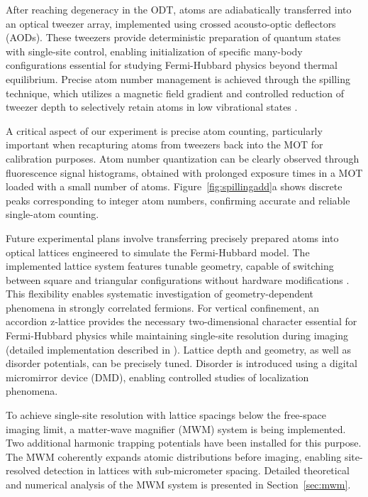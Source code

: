 After reaching degeneracy in the ODT, atoms are adiabatically transferred into an optical tweezer array, implemented using crossed acousto-optic deflectors (AODs). These tweezers provide deterministic preparation of quantum states with single-site control, enabling initialization of specific many-body configurations essential for studying Fermi-Hubbard physics beyond thermal equilibrium. Precise atom number management is achieved through the spilling technique, which utilizes a magnetic field gradient and controlled reduction of tweezer depth to selectively retain atoms in low vibrational states \cite{culemann_construction_2024, huang_construction_2024}.

A critical aspect of our experiment is precise atom counting, particularly important when recapturing atoms from tweezers back into the MOT for calibration purposes. Atom number quantization can be clearly observed through fluorescence signal histograms, obtained with prolonged exposure times in a MOT loaded with a small number of atoms. Figure~\ref{fig:spillingadd}a shows discrete peaks corresponding to integer atom numbers, confirming accurate and reliable single-atom counting.

Future experimental plans involve transferring precisely prepared atoms into optical lattices engineered to simulate the Fermi-Hubbard model. The implemented lattice system features tunable geometry, capable of switching between square and triangular configurations without hardware modifications \cite{dux_optical_2023}. This flexibility enables systematic investigation of geometry-dependent phenomena in strongly correlated fermions. For vertical confinement, an accordion z-lattice provides the necessary two-dimensional character essential for Fermi-Hubbard physics while maintaining single-site resolution during imaging (detailed implementation described in \cite{huang_construction_2024}). Lattice depth and geometry, as well as disorder potentials, can be precisely tuned. Disorder is introduced using a digital micromirror device (DMD), enabling controlled studies of localization phenomena. 

To achieve single-site resolution with lattice spacings below the free-space imaging limit, a matter-wave magnifier (MWM) system is being implemented. Two additional harmonic trapping potentials have been installed for this purpose. The MWM coherently expands atomic distributions before imaging, enabling site-resolved detection in lattices with sub-micrometer spacing. Detailed theoretical and numerical analysis of the MWM system is presented in Section~\ref{sec:mwm}.


